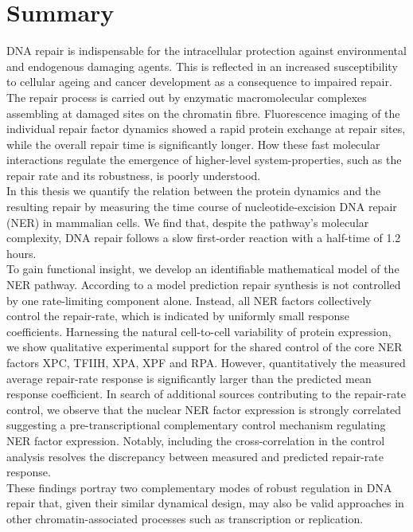\chapter*{Summary}
\thispagestyle{plain2}





DNA repair is indispensable for the intracellular protection against environmental and endogenous damaging agents.
This is reflected in an increased susceptibility to cellular ageing and cancer development as a consequence to impaired repair. The repair process is carried out by enzymatic macromolecular complexes assembling at damaged sites on the chromatin fibre. Fluorescence imaging of the individual repair factor dynamics showed a rapid protein exchange at repair sites, while the overall repair time is significantly longer. How these fast molecular interactions regulate the emergence of higher-level system-properties, such as the repair rate and its robustness, is poorly understood.\\ 
In this thesis we quantify the relation between the protein dynamics and the resulting repair by measuring the time course of nucleotide-excision DNA repair (NER) in mammalian cells. We find that, despite the pathway's molecular complexity, DNA repair follows a slow first-order reaction with a half-time of 1.2 hours. \\
To gain functional insight, we develop an identifiable mathematical model of the NER pathway. According to a model prediction repair synthesis is not controlled by one rate-limiting component alone. Instead, all NER factors collectively control the repair-rate, which is indicated by uniformly small response coefficients. Harnessing the natural cell-to-cell variability of protein expression, we show qualitative experimental support for the shared control of the core NER factors XPC, TFIIH, XPA, XPF and RPA. However, quantitatively the measured average repair-rate response is significantly larger than the predicted mean response coefficient. In search of additional sources contributing to the repair-rate control, we observe that the nuclear NER factor expression is strongly correlated suggesting a pre-transcriptional complementary control mechanism regulating NER factor expression. Notably, including the cross-correlation in the control analysis resolves the discrepancy between measured and predicted repair-rate response.\\  
These findings portray two complementary modes of robust regulation in DNA repair that, given their similar dynamical design, may also be valid approaches in other chromatin-associated processes such as transcription or replication.    



      
 


%